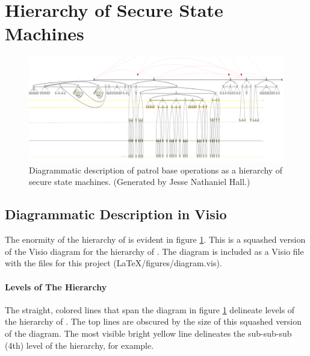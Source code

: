 \documentclass[../../main/main.tex]{subfiles}
\begin{document}
\section{Hierarchy of Secure State Machines}
\begin{figure}[h]
\includegraphics[width=\textwidth]{../figures/overalldiagramsquashed}
\caption{\label{overalldiagramsquashed}Diagrammatic description of patrol base operations as a hierarchy of secure state machines.  (Generated by Jesse Nathaniel Hall.)}
\end{figure}

\subsection{Diagrammatic Description in Visio}\label{ssec:overalldiagram}
The enormity of the hierarchy of  is evident in figure \ref{overalldiagramsquashed}.  This is a squashed version of the Visio diagram for the hierarchy of . The diagram is included as a Visio file with the files for this project (LaTeX/figures/diagram.vis).  

\paragraph*{Levels of The Hierarchy}

The straight, colored lines that span the diagram in figure \ref{overalldiagramsquashed} delineate levels of the hierarchy of .  The top lines are obscured by the size of this squashed version of the diagram.  The most visible bright yellow line delineates the sub-sub-sub (4th) level of the hierarchy, for example.
\end{document}
